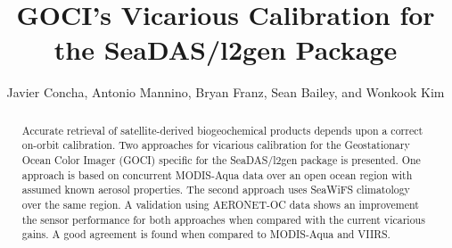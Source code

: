 \documentclass[10pt]{article}
\begin{document}
\title{GOCI's Vicarious Calibration for the SeaDAS/l2gen Package}

\author{Javier Concha, Antonio Mannino, Bryan Franz, Sean Bailey, and Wonkook Kim}

\address{Ocean Ecology Lab,
NASA Goddard Space Flight Center, Greenbelt, MD, USA\\
Universities Space Research Association, Columbia, MD, USA\\
Korea Institute of Ocean Science and Technology, Busan, Republic of Korea}




\begin{abstract}

Accurate retrieval of satellite-derived biogeochemical products depends upon a correct on-orbit calibration. 
Two approaches for vicarious calibration for the Geostationary Ocean Color Imager (GOCI) specific for the SeaDAS/l2gen package is presented.
One approach is based on concurrent MODIS-Aqua data over an open ocean region with assumed known aerosol properties.
The second approach uses SeaWiFS climatology over the same region.
A validation using AERONET-OC data shows an improvement the sensor performance for both approaches when compared with the current vicarious gains.
A good agreement is found when compared to MODIS-Aqua and VIIRS.
%
\end{abstract}

 
\end{document}
